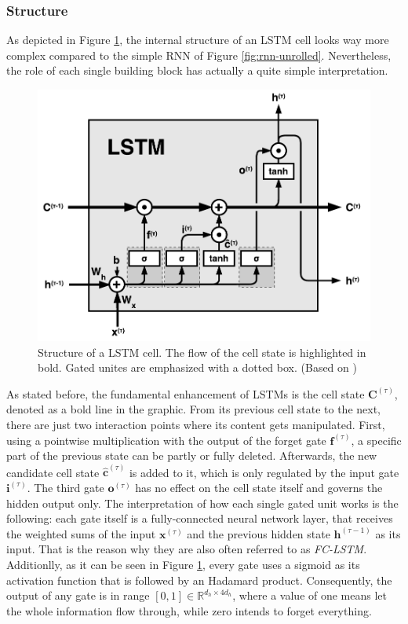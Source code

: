 \subsubsection{Structure}

As depicted in Figure \ref{fig:lstm}, the internal structure of an LSTM cell looks way more complex compared to the simple RNN of Figure \ref{fig:rnn-unrolled}. Nevertheless, the role of each single building block has actually a quite simple interpretation.

\begin{figure}[htpb]
	\centering
	\includegraphics[width=.8\linewidth]{figures/lstm.pdf}
	\caption[Structure of a LSLTM Cell]{Structure of a LSTM cell. The flow of the cell state is highlighted in bold. Gated unites are emphasized with a dotted box. (Based on \parencite{understand_lstm})} \label{fig:lstm}
\end{figure}

As stated before, the fundamental enhancement of LSTMs is the cell state $\textbf{C}^{(\tau)}$, denoted as a bold line in the graphic. From its previous cell state to the next, there are just two interaction points where its content gets manipulated. First, using a pointwise multiplication with the output of the forget gate $\textbf{f}^{(\tau)}$, a specific part of the previous state can be partly or fully deleted. Afterwards, the new candidate cell state $ \hat{\textbf{c}}^{(\tau)} $ is added to it, which is only regulated by the input gate $ \textbf{i}^{(\tau)} $. The third gate $ \textbf{o}^{(\tau)} $ has no effect on the cell state itself and governs the hidden output only.
The interpretation of how each single gated unit works is the following: each gate itself is a fully-connected neural network layer, that receives the weighted sums of the input $\textbf{x}^{(\tau)}$ and the previous hidden state $\textbf{h}^{(\tau-1)}$ as its input. That is the reason why they are also often referred to as \textit{FC-LSTM}. Additionlly, as it can be seen in Figure \ref{fig:lstm}, every gate uses a sigmoid as its activation function that is followed by an Hadamard product. Consequently, the output of any gate is in range $ [0, 1] \in \mathbb{R}^{d_h \times 4d_h} $, where a value of one means let the whole information flow through, while zero intends to forget everything. 

